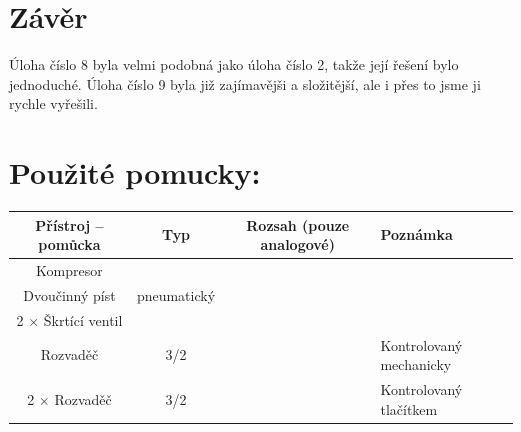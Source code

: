 \documentclass[a4paper]{article}
\begin{document}
\section*{Závěr}
Úloha číslo 8 byla velmi podobná jako úloha číslo 2, takže její řešení bylo jednoduché. Úloha číslo 9 byla již zajímavějši a složitější, ale i přes to jsme ji rychle vyřešili.
\section*{Použité pomucky:}
\begin{tabularx}{\linewidth}{c|c|c|l}
	Přístroj – pomůcka & Typ & Rozsah (pouze analogové)
	& Poznámka \\
	\hline
	Kompresor&&&\\
	\hline
	Dvoučinný píst& pneumatický&&\\
	\hline
	2 $\times$ Škrtící ventil&&&\\ \hline
	Rozvaděč&3/2&&Kontrolovaný mechanicky	\\ \hline
	2 $\times$ Rozvaděč&3/2&&Kontrolovaný tlačítkem	\\ \hline
\end{tabularx}
\end{document}
